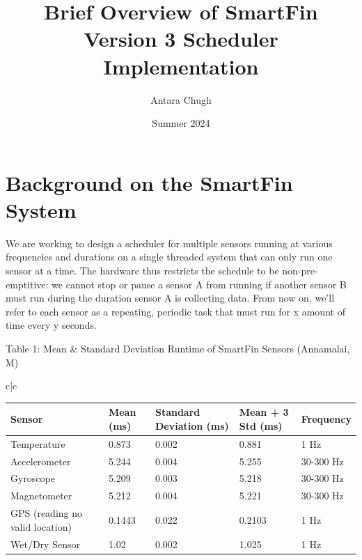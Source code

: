 \documentclass{article}
\title{Brief Overview of SmartFin Version 3 Scheduler Implementation}
\author{Antara Chugh} \and {Charlie Kushelevy} \and {Meena Annamalai}  \and {Hannah Cutler} \and {Nathan Hui} \and {Ryan Katsner}
\date{Summer 2024}
\begin{document}
\maketitle

\section{Background on the SmartFin System}

We are working to design a scheduler for multiple sensors running at various frequencies and durations on a single threaded system that can only run one sensor at a time. The hardware thus restricts the schedule to be non-pre-emptitive: we cannot stop or pause a sensor A from running if another sensor B must run during the duration sensor A is collecting data. From now on, we’ll refer to each sensor as a repeating, periodic task that must run for x amount of time every y seconds.


\caption{Table 1: Mean \& Standard Deviation Runtime of SmartFin Sensors (Annamalai, M)}




\begin{tabular}{c|c}
    \hspace{-3 cm}
    \begin{tabular}{| l | l | l | l | l |}
        \hline
        Sensor                          & Mean (ms) & Standard Deviation (ms) & Mean + 3 Std (ms) & Frequency \\
        \hline
        Temperature                     & 0.873     & 0.002                   & 0.881             & 1 Hz      \\
        \hline
        Accelerometer                   & 5.244     & 0.004                   & 5.255             & 30-300 Hz \\
        \hline
        Gyroscope                       & 5.209     & 0.003                   & 5.218             & 30-300 Hz \\
        \hline
        Magnetometer                    & 5.212     & 0.004                   & 5.221             & 30-300 Hz \\
        \hline
        GPS (reading no valid location) & 0.1443    & 0.022                   & 0.2103            & 1 Hz      \\
        \hline
        Wet/Dry Sensor                  & 1.02      & 0.002                   & 1.025             & 1 Hz      \\
        \hline
    \end{tabular}
\end{tabular}
\end{document}
